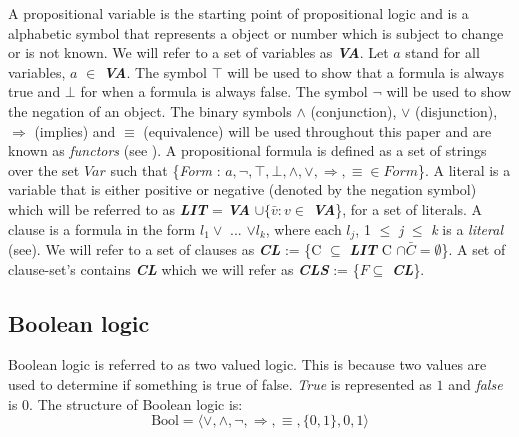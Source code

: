\documentclass[11pt,a4paper]{article}
\begin{document}
A propositional variable is the starting point of propositional logic and is a alphabetic symbol that represents a object or number which is subject to change or is not known. We will refer to a set of variables as \textit{\textbf{VA}}. Let $a$ stand for all variables, $a$ $\in$ \textit{\textbf{VA}}. The symbol $\top$ will be used to show that a formula is always true and $\bot$ for when a formula is always false. The symbol $\neg$ will be used to show the negation of an object. The binary symbols $\land$ (conjunction), $\lor$ (disjunction), $\Rightarrow$ (implies) and $\equiv$ (equivalence) will be used throughout this paper and are known as \textit{functors} (see \cite{Marek2009Introduction}). A propositional formula is defined as a set of strings over the set $Var$ such that \{\textit{Form} : $a, \neg, \top, \bot, \land, \lor, \Rightarrow, \equiv \in Form$\}. A literal is a variable that is either positive or negative (denoted by the negation symbol) which will be referred to as \textbf{\textit{LIT}} =  \textit{\textbf{VA}} $\cup \{ \bar{v} : v \in$ \textbf{\textit{VA}}\}, for a set of literals. A clause is a formula in the form $l_1 \lor$ ... $\lor l_k$, where each $l_j$, 1 $\le$ \textit{j} $\le$ \textit{k} is a \textit{literal} (see\cite{Marek2009Introduction}). We will refer to a set of clauses as \textbf{\textit{CL}} := \{C $\subseteq$ \textbf{\textit{LIT}} C $\cap \bar{C} = \emptyset$\}. A set of clause-set's contains \textbf{\textit{CL}} which we will refer as \textbf{\textit{CLS}} := \{$F \subseteq$ \textit{\textbf{CL}}\}. 

\subsection{Boolean logic}
\label{sec:bool}

Boolean logic is referred to as two valued logic. This is because two values are used to determine if something is true of false. \emph{True} is represented as $1$ and \emph{false} is $0$. The structure of Boolean logic is:
\begin{displaymath}
\text{Bool} = \langle \lor, \land, \neg, \Rightarrow, \equiv,\{0,1\}, 0, 1 \rangle
\end{displaymath}
\end{document}
